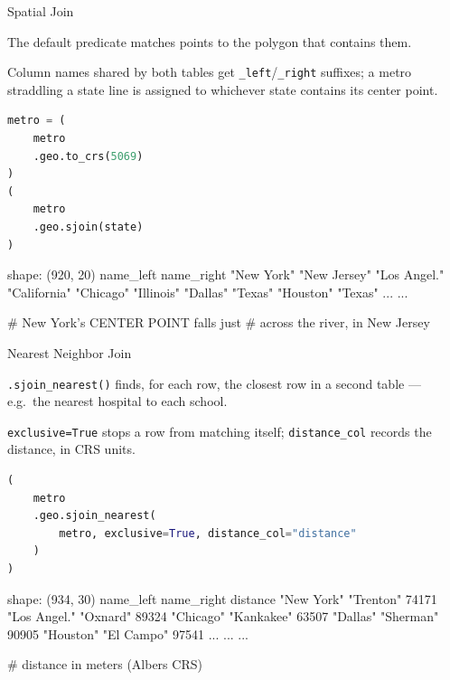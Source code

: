 \documentclass[8pt,aspectratio=169]{beamer}
\begin{document}
\begin{frame}[fragile]{Spatial Join}
\begin{splitcode}{%

The default predicate matches points to the polygon that contains them.

Column names shared by both tables get \texttt{\_left}/\texttt{\_right} suffixes; a metro straddling a state line is assigned to whichever state contains its center point.

}
\begin{lstlisting}[language=Python]
metro = (
    metro
    .geo.to_crs(5069)
)
(
    metro
    .geo.sjoin(state)
)
\end{lstlisting}
\begin{codeoutput}
shape: (920, 20)
name_left     name_right
"New York"    "New Jersey"
"Los Angel."  "California"
"Chicago"     "Illinois"
"Dallas"      "Texas"
"Houston"     "Texas"
...           ...

# New York's CENTER POINT falls just
# across the river, in New Jersey
\end{codeoutput}
\end{splitcode}
\end{frame}

\begin{frame}[fragile]{Nearest Neighbor Join}
\begin{splitcode}{%

\texttt{.sjoin\_nearest()} finds, for each row, the closest row in a second table --- e.g.\ the nearest hospital to each school.

\texttt{exclusive=True} stops a row from matching itself; \texttt{distance\_col} records the distance, in CRS units.

}
\begin{lstlisting}[language=Python]
(
    metro
    .geo.sjoin_nearest(
        metro, exclusive=True, distance_col="distance"
    )
)
\end{lstlisting}
\begin{codeoutput}
shape: (934, 30)
name_left     name_right  distance
"New York"    "Trenton"   74171
"Los Angel."  "Oxnard"    89324
"Chicago"     "Kankakee"  63507
"Dallas"      "Sherman"   90905
"Houston"     "El Campo"  97541
...           ...         ...

# distance in meters (Albers CRS)
\end{codeoutput}
\end{splitcode}
\end{frame}
\end{document}
